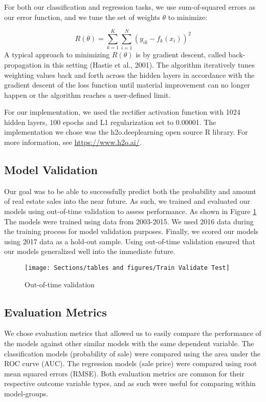 \documentclass[12pt,]{article}
\begin{document}
For both our classification and regression tasks, we use sum-of-squared
errors as our error function, and we tune the set of weights \(\theta\)
to minimize:

\[
R(\theta)=\sum_{k=1}^K\sum_{i=1}^N(y_{ik}-f_{k}(x_i))^2
\] A typical approach to minimizing \(R(\theta)\) is by gradient
descent, called back-propagation in this setting (Hastie et al., 2001).
The algorithm iteratively tunes weighting values back and forth across
the hidden layers in accordance with the gradient descent of the loss
function until material improvement can no longer happen or the
algorithm reaches a user-defined limit.

For our implementation, we used the rectifier activation function with
1024 hidden layers, 100 epochs and L1 regularization set to 0.00001. The
implementation we chose was the h2o.deeplearning open source R library.
For more information, see \url{https://www.h2o.ai/}.

\hypertarget{model-validation}{%
\subsection{Model Validation}\label{model-validation}}

Our goal was to be able to successfully predict both the probability and
amount of real estate sales into the near future. As such, we trained
and evaluated our models using out-of-time validation to assess
performance. As shown in Figure \ref{fig:Train Test Validate} The models
were trained using data from 2003-2015. We used 2016 data during the
training process for model validation purposes. Finally, we scored our
models using 2017 data as a hold-out sample. Using out-of-time
validation ensured that our models generalized well into the immediate
future.

\begin{figure}[H]
\texttt{[image: Sections/tables and figures/Train Validate Test]} \caption{Out-of-time validation}\label{fig:Train Test Validate}
\end{figure}

\hypertarget{evaluation-metrics}{%
\subsection{Evaluation Metrics}\label{evaluation-metrics}}

We chose evaluation metrics that allowed us to easily compare the
performance of the models against other similar models with the same
dependent variable. The classification models (probability of sale) were
compared using the area under the ROC curve (AUC). The regression models
(sale price) were compared using root mean squared errors (RMSE). Both
evaluation metrics are common for their respective outcome variable
types, and as such were useful for comparing within model-groups.
\end{document}

